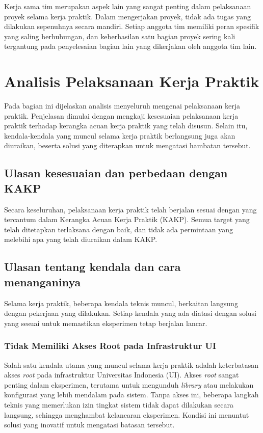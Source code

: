 Kerja sama tim merupakan aspek lain yang sangat penting dalam pelaksanaan proyek selama kerja praktik. Dalam mengerjakan proyek, tidak ada tugas yang dilakukan sepenuhnya secara mandiri. Setiap anggota tim memiliki peran spesifik yang saling berhubungan, dan keberhasilan satu bagian proyek sering kali tergantung pada penyelesaian bagian lain yang dikerjakan oleh anggota tim lain.

\section{Analisis Pelaksanaan Kerja Praktik}

Pada bagian ini dijelaskan analisis menyeluruh mengenai pelaksanaan kerja praktik. Penjelasan dimulai dengan mengkaji kesesuaian pelaksanaan kerja praktik terhadap kerangka acuan kerja praktik yang telah disusun. Selain itu, kendala-kendala yang muncul selama kerja praktik berlangsung juga akan diuraikan, beserta solusi yang diterapkan untuk mengatasi hambatan tersebut.

\subsection{Ulasan kesesuaian dan perbedaan dengan KAKP}

Secara keseluruhan, pelaksanaan kerja praktik telah berjalan sesuai dengan yang tercantum dalam Kerangka Acuan Kerja Praktik (KAKP). Semua target yang telah ditetapkan terlaksana dengan baik, dan tidak ada permintaan yang melebihi apa yang telah diuraikan dalam KAKP.

\subsection{Ulasan tentang kendala dan cara menanganinya}

Selama kerja praktik, beberapa kendala teknis muncul, berkaitan langsung dengan pekerjaan yang dilakukan. Setiap kendala yang ada diatasi dengan solusi yang sesuai untuk memastikan eksperimen tetap berjalan lancar.

\subsubsection{Tidak Memiliki Akses Root pada Infrastruktur UI}

Salah satu kendala utama yang muncul selama kerja praktik adalah keterbatasan akses \textit{root} pada infrastruktur Universitas Indonesia (UI). Akses \textit{root} sangat penting dalam eksperimen, terutama untuk mengunduh \textit{library} atau melakukan konfigurasi yang lebih mendalam pada sistem. Tanpa akses ini, beberapa langkah teknis yang memerlukan izin tingkat sistem tidak dapat dilakukan secara langsung, sehingga menghambat kelancaran eksperimen. Kondisi ini menuntut solusi yang inovatif untuk mengatasi batasan tersebut.

